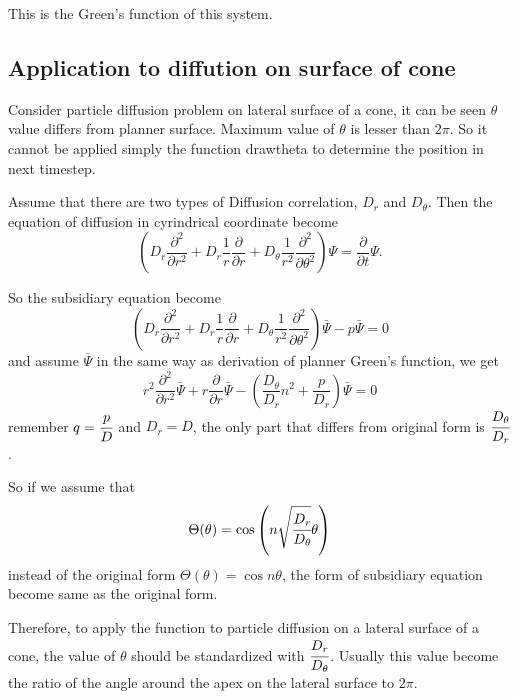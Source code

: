 \documentclass{article}
\begin{document}
This is the Green's function of this system.


\subsection{Application to diffution on surface of cone}
Consider particle diffusion problem on lateral surface of a cone, it can be seen $\theta$ value differs from planner surface. Maximum value of $\theta$ is lesser than $2\pi$. So it cannot be applied simply the function drawtheta to determine the position in next timestep.

Assume that there are two types of Diffusion correlation, $D_r$ and $D_\theta$. Then the equation of diffusion in cyrindrical coordinate become
\begin{equation}\label{two-D-difeq}
    \left( D_r\frac{\partial^2}{\partial r^2} +
           D_r\frac{1}{r}\frac{\partial}{\partial r} +
           D_\theta\frac{1}{r^2}\frac{\partial^2}{\partial \theta^2} \right) \Psi
    = \frac{\partial}{\partial t} \Psi.
\end{equation}

So the subsidiary equation become 
\begin{equation}
    \left( D_r\frac{\partial^2}{\partial r^2} +
           D_r\frac{1}{r}\frac{\partial}{\partial r} +
       D_\theta\frac{1}{r^2}\frac{\partial^2}{\partial \theta^2} \right) \bar{\Psi}
           - p\bar{\Psi} = 0
\end{equation}
and assume $\bar{\Psi}$ in the same way as derivation of planner Green's function, we get
\begin{equation}
    r^2 \frac{\partial^2}{\partial r^2} \bar{\Psi} +
    r \frac{\partial}{\partial r} \bar{\Psi} -
    (\frac{D_\theta}{D_r}n^2 + \frac{p}{D_r})\bar{\Psi} = 0
\end{equation}
remember $q = \cfrac{p}{D}$ and $D_r = D$, the only part that differs from original form is $\cfrac{D_\theta}{D_r}$.

So if we assume that
\begin{equation}
    \Theta(\theta) = \cos\left(n\sqrt{\cfrac{D_r}{D_\theta}}\theta\right)
\end{equation}
instead of the original form $\Theta(\theta) = \cos n\theta$, the form of subsidiary equation become same as the original form.

Therefore, to apply the function to particle diffusion on a lateral surface of a cone, the value of $\theta$ should be standardized with $\cfrac{D_r}{D_\theta}$. Usually this value become the ratio of the angle around the apex on the lateral surface to $2\pi$.
\end{document}
